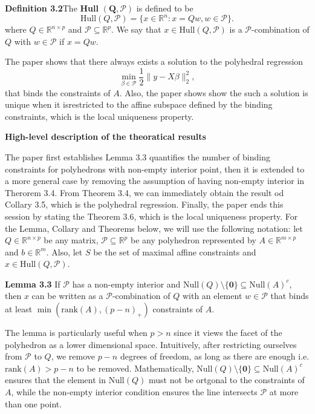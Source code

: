 \documentclass[11pt]{article}
\begin{document}
\textbf{Definition 3.2}\quad  The \textbf{Hull} $\pmb{(Q, \mathcal{P})}$ is defined to be
\begin{equation}
    \text{Hull}(Q, \mathcal{P}) = \{ x \in \mathbb{R}^n : x = Qw, w \in \mathcal{P} \}.
\end{equation}
where  $Q \in \mathbb{R}^{n \times p} $ and $\mathcal{P} \subseteq \mathbb{R}^{p}$.
We say that $x \in \text{Hull}(Q, \mathcal{P})$ is a $\mathcal{P}$-combination of $Q$ with 
$w \in \mathcal{P}$ if $x = Qw$.

The paper shows that there always exists a solution to the polyhedral regression
\begin{equation}\label{pr}
    \min_{\beta \in \mathcal{P}} \frac{1}{2} \| y - X \beta \|_2^2,
\end{equation}
that binds the constraints of $A$. Also, the paper shows show the such a solution is unique when 
it isrestricted to the affine subspace defined by the binding constraints, which is the local 
uniqueness property.

\textbf{High-level description of the theoratical results}


The paper first establishes Lemma 3.3 quantifies the number of binding constraints for polyhedrons 
with non-empty interior point, then it is extended to a more general case by removing the assumption
of having non-empty interior in Therorem 3.4. From Theorem 3.4, we can immediately obtain the result
od Collary 3.5, which is the polyhedral regression. Finally, the paper ends this session by stating
the Theorem 3.6, which is the local uniqueness property.
For the Lemma, Collary and Theorems below, we will use the following notation: let 
$Q \in \mathbb{R}^{n \times p}$ be any matrix, $\mathcal{P} \subseteq \mathbb{R}^{p}$ be any polyhedron
represented by $A \in \mathbb{R}^{m \times p}$ and $b \in \mathbb{R}^{m}$. Also, let $S$ be the set of
maximal affine constraints and $x \in \text{Hull}(Q, \mathcal{P})$.

\textbf{Lemma 3.3}\quad 
If $\mathcal{P}$ has a non-empty interior and 
$\text{Null}(Q)\setminus\{\pmb{0}\}\subseteq\text{Null}(A)^c$, then $x$ can be written as a 
$\mathcal{P}$-combination of $Q$ with an element $w \in \mathcal{P}$ that binds at least 
$\min(\text{rank}(A), (p - n)_+)$ constraints of $A$.

The lemma is particularly useful when $p > n$ since it views the facet of the polyhedron as a lower
dimensional space. Intuitively, after restricting ourselves from $\mathcal{P}$ to $Q$, we remove 
$p - n$ degrees of freedom, as long as there are enough i.e. $\text{rank}(A) > p - n$ to be removed. 
Mathematically, $\text{Null}(Q)\setminus\{\pmb{0}\}\subseteq\text{Null}(A)^c$ ensures that the
element in $\text{Null}(Q)$ must not be ortgonal to the constraints of $A$, while the non-empty 
interior condition ensures the line intersects $\mathcal{P}$ at more than one point.
\end{document}
